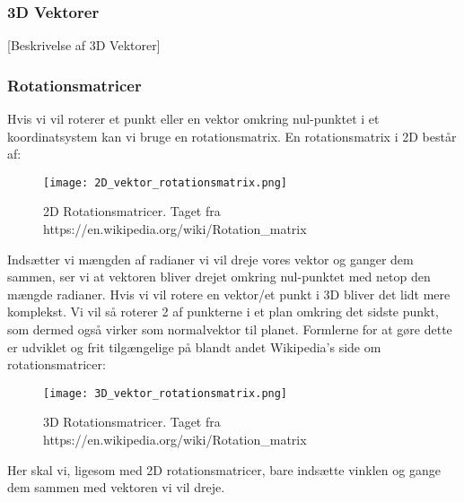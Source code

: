 \subsubsection{3D Vektorer}

[Beskrivelse af 3D Vektorer]


\subsubsection{Rotationsmatricer}
Hvis vi vil roterer et punkt eller en vektor omkring nul-punktet i et koordinatsystem kan vi bruge en rotationsmatrix\cite{rotationsmatricer}. En rotationsmatrix i 2D består af:
\begin{figure}[H]
  \centering
  \texttt{[image: 2D\_vektor\_rotationsmatrix.png]}
  \caption{2D Rotationsmatricer. Taget fra https://en.wikipedia.org/wiki/Rotation\_matrix}
\end{figure}
Indsætter vi mængden af radianer vi vil dreje vores vektor og ganger dem sammen, ser vi at vektoren bliver drejet omkring nul-punktet med netop den mængde radianer. 
Hvis vi vil rotere en vektor/et punkt i 3D bliver det lidt mere komplekst. Vi vil så roterer 2 af punkterne i et plan omkring det sidste punkt, som dermed også virker som normalvektor til planet. Formlerne for at gøre dette er udviklet og frit tilgængelige på blandt andet Wikipedia's side om rotationsmatricer:
\begin{figure}[H]
  \centering
  \texttt{[image: 3D\_vektor\_rotationsmatrix.png]}
  \caption{3D Rotationsmatricer. Taget fra https://en.wikipedia.org/wiki/Rotation\_matrix}
\end{figure}
Her skal vi, ligesom med 2D rotationsmatricer, bare indsætte vinklen og gange dem sammen med vektoren vi vil dreje.